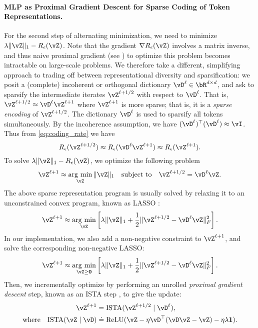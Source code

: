 \documentclass[\toplevelprefix/book-main.tex]{subfiles}
\begin{document}
\paragraph{MLP as Proximal Gradient Descent for Sparse Coding of Token Representations.} For the second step of alternating minimization, we need to minimize $\lambda \norm{\vZ}_{1} - R_{\epsilon}(\vZ)$. Note that the gradient \(\nabla R_{\epsilon}(\vZ)\) involves a matrix inverse, and thus naive proximal gradient (see ) to optimize this problem becomes intractable on large-scale problems. %
We therefore take a different, simplifying approach to trading off between representational diversity and sparsification: we posit a (complete) incoherent or orthogonal dictionary $\vD^{\ell} \in \bR^{d \times d}$, and ask to sparsify the intermediate iterates $\vZ^{\ell + 1/2}$ with respect to \(\vD^{\ell}\). That is, $\vZ^{\ell + 1/2} \approx \vD^{\ell} \vZ^{\ell + 1}$ where $\vZ^{\ell + 1}$ is more sparse; that is, it is a \textit{sparse encoding} of \(\vZ^{\ell + 1/2}\). The dictionary \(\vD^{\ell}\) is used to sparsify all tokens simultaneously. 
By the incoherence assumption, we have $(\vD^{\ell})^\top(\vD^{\ell}) \approx \vI$. Thus from \eqref{eq:coding_rate} we have 
\begin{equation}
    R_{\epsilon}(\vZ^{\ell + 1/2}) \approx R_{\epsilon}(\vD^{\ell}\vZ^{\ell + 1}) \approx R_{\epsilon}(\vZ^{\ell + 1}).
\end{equation}  
To solve $\lambda \norm{\vZ}_{1} - R_{\epsilon}(\vZ)$, we optimize the following problem
\begin{align*}
       \vZ^{\ell + 1} \approx \argmin_{\vZ}  \norm{\vZ}_1 \quad \mbox{subject to} \quad \vZ^{\ell + 1/2} = \vD^{\ell}\vZ.
\end{align*}
{The above sparse representation program is usually solved by relaxing it to an unconstrained convex program, known as LASSO \citep{Wright-Ma-2022}:} 
\begin{equation}
    \vZ^{\ell + 1} \approx \argmin_{\vZ} \left[\lambda \norm{\vZ}_1 + \frac{1}{2}\norm{\vZ^{\ell + 1/2} - \vD^{\ell} \vZ}_F^2 \right].
\end{equation}
In our implementation, we also add a non-negative constraint to $\vZ^{\ell + 1}$, and solve the corresponding non-negative LASSO:
\begin{equation}
    \vZ^{\ell + 1} \approx \argmin_{\vZ \geq \bm 0} \left[\lambda\norm{\vZ}_1 + \frac{1}{2}\norm{\vZ^{\ell + 1/2} - \vD^{\ell} \vZ}_{F}^{2}\right].
    \label{eq:sparse-nonnegative}
\end{equation}
Then, we incrementally optimize  by performing an unrolled {\em proximal gradient descent} step, known as an ISTA step \citep{beck2009fast}, to give the update:
\begin{align}\label{eq:ista-block}
    \vZ^{\ell + 1} 
    &= \mathrm{ISTA}({\vZ^{\ell + 1/2} \mid \vD^{\ell}}), \\
    \text{where} \quad \mathrm{ISTA}({\vZ \mid \vD}) 
    &\doteq \operatorname{ReLU}(\vZ - \eta \vD^\top(\vD\vZ - \vZ) - \eta \lambda \bm{1}).
\end{align}
\end{document}
